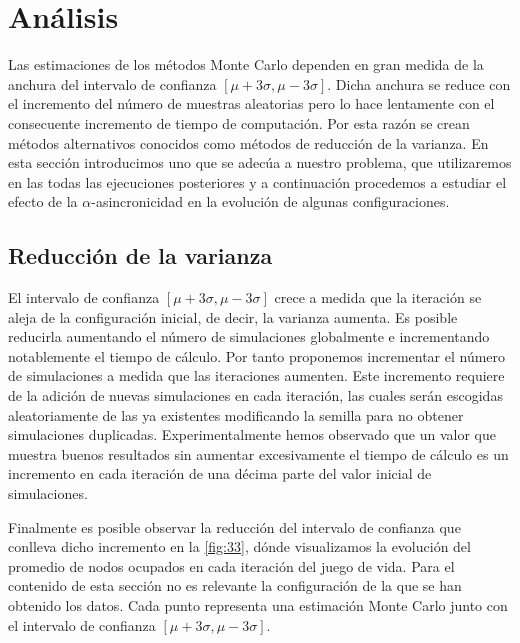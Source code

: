 \documentclass[../proyecto.tex]{memoir}
\begin{document}
\chapter{Análisis}

Las estimaciones de los métodos Monte Carlo dependen en gran medida de la anchura del intervalo de confianza $[\mu+3\sigma, \mu-3\sigma]$. Dicha anchura se reduce con el incremento del número de muestras aleatorias pero lo hace lentamente con el consecuente incremento de tiempo de computación. Por esta razón se crean métodos alternativos conocidos como métodos de reducción de la varianza. En esta sección introducimos uno que se adecúa a nuestro problema, que utilizaremos en las todas las ejecuciones posteriores y a continuación procedemos a estudiar el efecto de la $\alpha$-asincronicidad en la evolución de algunas configuraciones.

\section{Reducción de la varianza}

El intervalo de confianza $[\mu+3\sigma, \mu-3\sigma]$ crece a medida que la iteración se aleja de la configuración inicial, de decir, la varianza aumenta. Es posible reducirla aumentando el número de simulaciones globalmente e incrementando notablemente el tiempo de cálculo. Por tanto proponemos incrementar el número de simulaciones a medida que las iteraciones aumenten. Este incremento requiere de la adición de nuevas simulaciones en cada iteración, las cuales serán escogidas aleatoriamente de las ya existentes modificando la semilla para no obtener simulaciones duplicadas. Experimentalmente hemos observado que un valor que muestra buenos resultados sin aumentar excesivamente el tiempo de cálculo es un incremento en cada iteración de una décima parte del valor inicial de simulaciones. 

Finalmente es posible observar la reducción del intervalo de confianza que conlleva dicho incremento en la \autoref{fig:33}, dónde visualizamos la evolución del promedio de nodos ocupados en cada iteración del juego de vida. Para el contenido de esta sección no es relevante la configuración de la que se han obtenido los datos. Cada punto representa una estimación Monte Carlo junto con el intervalo de confianza $[\mu+3\sigma, \mu-3\sigma]$.
\end{document}

